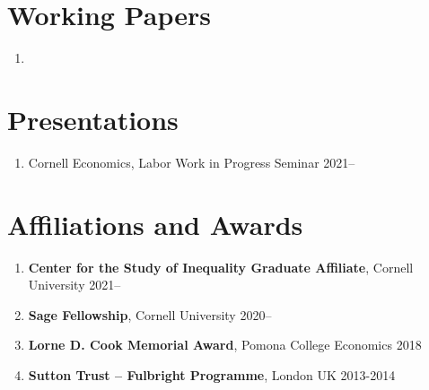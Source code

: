 \documentclass[letterpaper,11pt,oneside]{article}
\begin{document}
\section*{Working Papers}
\begin{enumerate}[itemsep=2.5pt, label={}]
    \item {}
\end{enumerate}


 
\section*{Presentations}
\begin{enumerate}[noitemsep, label={}]
    \item Cornell Economics, Labor Work in Progress Seminar 2021--
\end{enumerate}

\section*{Affiliations and Awards}
\begin{enumerate}[itemsep=2pt, label={}]
    \item \textbf{Center for the Study of Inequality Graduate Affiliate}, Cornell University 2021--
    \item \textbf{Sage Fellowship}, Cornell University 2020--
    \item \textbf{Lorne D. Cook Memorial Award}, Pomona College Economics 2018
    \item \textbf{Sutton Trust -- Fulbright Programme}, London UK 2013-2014  
\end{enumerate}
\end{document}
